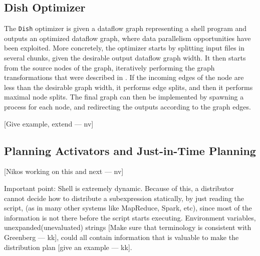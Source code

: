 \documentclass[sigplan,10pt,review,anonymous]{acmart}
\newcommand{\ttt}[1]{\texttt{\small #1}}
\newcommand{\nv}[1]{[{\color{cyan}#1 --- nv}]}
\newcommand{\kk}[1]{[{\color{magenta}#1 --- kk}]}
\begin{document}
\subsection{Dish Optimizer}

The \ttt{Dish} optimizer is given a dataflow graph representing a
shell program and outputs an optimized dataflow graph, where data
parallelism opportunities have been exploited. More concretely, the
optimizer starts by splitting input files in several chunks, given the
desirable output dataflow graph width. It then starts from the source
nodes of the graph, iteratively performing the graph transformations
that were described in . If the incoming
edges of the node are less than the desirable graph width, it performs
edge splits, and then it performs maximal node splits. The final graph
can then be implemented by spawning a process for each node, and
redirecting the outputs according to the graph edges.

\nv{Give example, extend}






\subsection{Planning Activators and Just-in-Time Planning}

\nv{Nikos working on this and next}


Important point: Shell is extremely dynamic. Because of this, a
distributor cannot decide how to distribute a subexpression
statically, by just reading the script, (as in many other systems like
MapReduce, Spark, etc), since most of the information is not there
before the script starts executing. Environment variables,
unexpanded(unevaluated) strings \kk{Make sure that terminology is
  consistent with Greenberg}, could all contain information that is
valuable to make the distribution plan \kk{give an example}.
\end{document}
